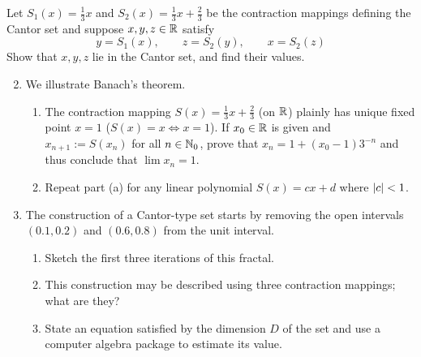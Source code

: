 \begin{exercises}
	\exstart Let $S_1(x)=\frac 13 x$ and $S_2(x)=\frac 13x+\frac 23$ be the contraction mappings defining the Cantor set and suppose $x,y,z\in\mathbb{R}$ satisfy
	\[
		y=S_1(x),\qquad z=S_2(y),\qquad x=S_2(z)
	\]
	Show that $x,y,z$ lie in the Cantor set, and find their values.
	
	  
	\begin{enumerate}\setcounter{enumi}{1}
	  \item We illustrate Banach's theorem.
	  \begin{enumerate}
	    \item The contraction mapping $S(x)=\frac 13x+\frac 23$ (on $\mathbb{R}$) plainly has unique fixed point $x=1$ ($S(x)=x\Longleftrightarrow x=1$). If $x_0\in\mathbb{R}$ is given and $x_{n+1}:=S(x_n)$ for all $n\in\mathbb{N}_0$, prove that $x_n=1+(x_0-1)3^{-n}$ and thus conclude that $\lim x_n=1$.
	    \item Repeat part (a) for any linear polynomial $S(x)=cx+d$ where $\left| c\right|<1$. 
	  \end{enumerate}
	  
	  
	  \item The construction of a Cantor-type set starts by removing the open intervals $(0.1,0.2)$ and $(0.6,0.8)$ from the unit interval.
	  \begin{enumerate}
	    \item Sketch the first three iterations of this fractal.
	    \item This construction may be described using three contraction mappings; what are they?
	    \item State an equation satisfied by the dimension $D$ of the set and use a computer algebra package to estimate its value.
	  \end{enumerate}
	  

\end{enumerate}
\end{exercises}
